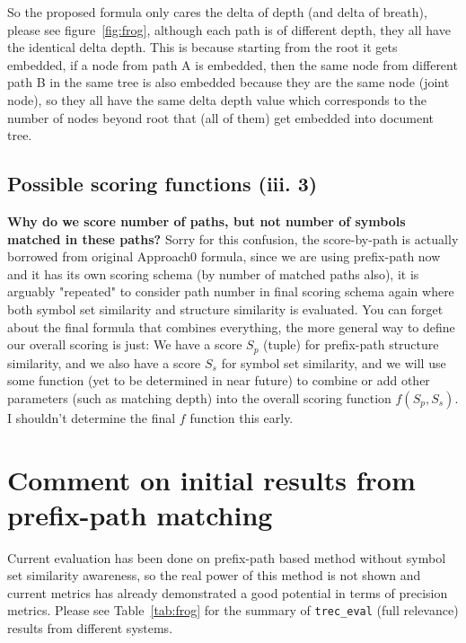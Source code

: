\documentclass[a4paper]{article}
\begin{document}
So the proposed formula only cares the delta of depth (and delta of breath), please see figure~\ref{fig:frog}, although each path is of different depth, they all have the identical delta depth. This is because starting from the root it gets embedded, if a node from path A is embedded, then the same node from different path B in the same tree is also embedded because they are the same node (joint node), so they all have the same delta depth value which corresponds to the number of nodes beyond root that (all of them) get embedded into document tree.

\subsection{Possible scoring functions (iii. 3)}
\textbf{Why do we score number of paths, but not number of symbols matched in these paths?}
Sorry for this confusion, the score-by-path is actually borrowed from original Approach0 formula, since we are using prefix-path now and it has its own scoring schema (by number of matched paths also), it is arguably "repeated" to consider path number in final scoring schema again where both symbol set similarity and structure similarity is evaluated. You can forget about the final formula that combines everything, the more general way to define our overall scoring is just: We have a score $S_p$ (tuple) for prefix-path structure similarity, and we also have a score $S_s$ for symbol set similarity, and we will use some function (yet to be determined in near future) to combine or add other parameters (such as matching depth) into the overall scoring function $f(S_p, S_s)$. I shouldn't determine the final $f$ function this early.

\section{Comment on initial results from prefix-path matching}
Current evaluation has been done on prefix-path based method without symbol set similarity awareness, so the real power of this method is not shown and current metrics has already demonstrated a good potential in terms of precision metrics.
Please see Table~\ref{tab:frog} for the summary of \verb|trec_eval| (full relevance) results from different systems.
\end{document}
